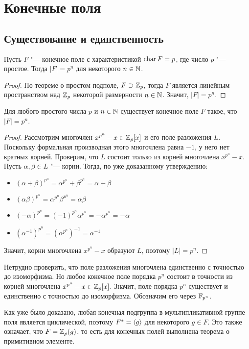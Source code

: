 \section{Конечные поля}

\subsection{Существование и единственность}

\begin{proposition}
	Пусть $F$ "--- конечное поле с характеристикой $\operatorname{char}{F} = p$, где число $p$ "--- простое. Тогда $|F| = p^n$ для некоторого $n \in \mathbb{N}$.
\end{proposition}

\begin{proof}
	По теореме о простом подполе, $F \supset \mathbb{Z}_p$, тогда $F$ является линейным пространством над $\mathbb{Z}_p$ некоторой размерности $n \in \mathbb{N}$. Значит, $|F| = p^n$.
\end{proof}

\begin{proposition}
	Для любого простого числа $p$ и $n \in \mathbb{N}$ существует конечное поле $F$ такое, что $|F| = p^n$.
\end{proposition}

\begin{proof}
	Рассмотрим многочлен $x^{p^n} - x \in \mathbb{Z}_p[x]$ и его поле разложения $L$. Поскольку формальная производная этого многочлена равна $-1$, у него нет кратных корней. Проверим, что $L$ состоит только из корней многочлена $x^{p^n} - x$. Пусть $\alpha, \beta \in L$ "--- корни. Тогда, по уже доказанному утверждению:
	\begin{itemize}
		\item $(\alpha + \beta)^{p^n} = \alpha^{p^n} + \beta^{p^n} = \alpha + \beta$
		\item $(\alpha\beta)^{p^n} = \alpha^{p^n}\beta^{p^n} = \alpha\beta$
		\item $(-\alpha)^{p^n} = (-1)^{p^n}\alpha^{p^n} = -\alpha^{p^n} = -\alpha$
		\item $(\alpha^{-1})^{p^n} = (\alpha^{p^n})^{-1} = \alpha^{-1}$
	\end{itemize}

	Значит, корни многочлена $x^{p^n} - x$ образуют $L$, поэтому $|L| = p^n$.
\end{proof}

\begin{note}
	Нетрудно проверить, что поле разложения многочлена единственно с точностью до изоморфизма. Но любое конечное поле порядка $p^n$ состоит в точности из корней многочлена $x^{p^n} - x \in \mathbb{Z}_p[x]$. Значит, поле порядка $p^n$ существует и единственно с точностью до изоморфизма. Обозначим его через $\mathbb{F}_{p^n}$.
\end{note}

\begin{note}
	Как уже было доказано, любая конечная подгруппа в мультипликативной группе поля является циклической, поэтому $F^* = \langle g\rangle$ для некоторого $g \in F$. Это также означает, что $F = \mathbb{Z}_p(g)$, то есть для конечных полей выполнена теорема о примитивном элементе.
\end{note}